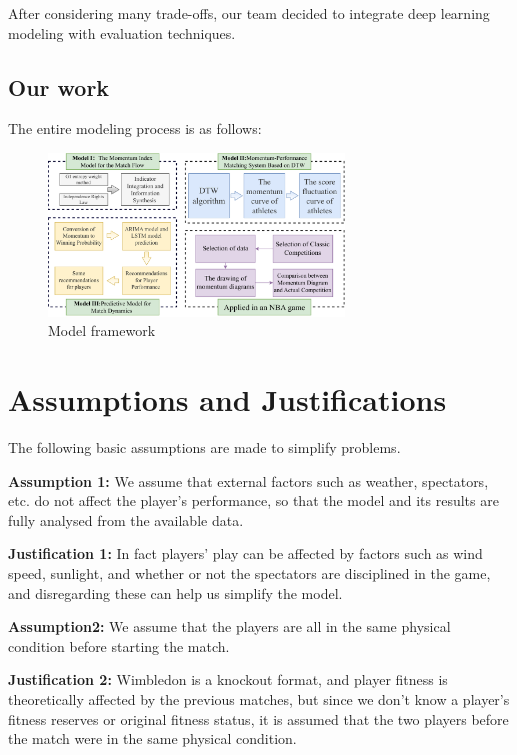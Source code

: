 \documentclass[12pt]{article}  %
\begin{document}
After considering many trade-offs, our team decided to integrate deep learning modeling with evaluation techniques.

\subsection{Our work}

The entire modeling process is as follows:

\begin{figure}[h] %
	\centering %
	\includegraphics[width=0.7\textwidth]{picture/our_work.pdf} %
	\caption{Model framework} %
	\label{} %
\end{figure}
\FloatBarrier

\section{Assumptions and Justifications}
The following basic assumptions are made to simplify problems.
      
    \textbf{Assumption 1:} We assume that external factors such as weather, spectators, etc. do not affect the player's performance, so that the model and its results are fully analysed from the available data.
    
    \textbf{Justification 1:} In fact players' play can be affected by factors such as wind speed, sunlight, and whether or not the spectators are disciplined in the game, and disregarding these can help us simplify the model.
    
    \textbf{Assumption2:} We assume that the players are all in the same physical condition before starting the match.
    
    \textbf{Justification 2:} Wimbledon is a knockout format, and player fitness is theoretically affected by the previous matches, but since we don't know a player's fitness reserves or original fitness status, it is assumed that the two players before the match were in the same physical condition.
    
\end{document}

